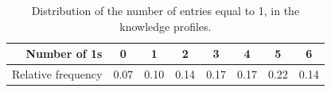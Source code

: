 \begin{table}[ht]
	\caption{Distribution of the number of entries equal to 1, in the knowledge profiles.}
	\centering\begin{tabular}{r|ccccccc}
		\hline
		Number of 1s & 0 & 1 & 2 & 3 & 4 & 5 & 6 \\ [0ex]
		\hline
		Relative frequency & 0.07 & 0.10 & 0.14 & 0.17 & 0.17 & 0.22 & 0.14 \\ [0ex]
		\hline
	\end{tabular}
	\label{Tab.1}
\end{table}
